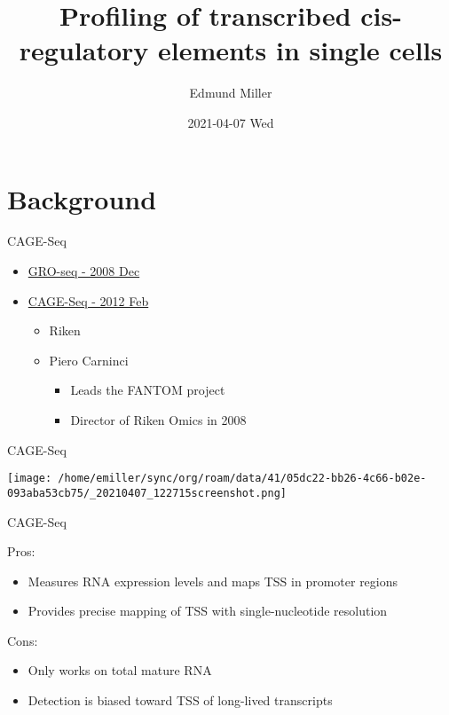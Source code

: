 \documentclass[bigger]{beamer}
\author{Edmund Miller}
\date{2021-04-07 Wed}
\title{Profiling of transcribed cis-regulatory elements in single cells}
\begin{document}
\maketitle

\section{Background}
\label{sec:orgb7d8447}

\begin{frame}[label={sec:orgd54c556}]{CAGE-Seq}
\begin{itemize}
\item \href{https://pubmed.ncbi.nlm.nih.gov/19056941/}{GRO-seq - 2008 Dec}
\item \href{https://pubmed.ncbi.nlm.nih.gov/22362160/}{CAGE-Seq - 2012 Feb}
\begin{itemize}
\item Riken
\item Piero Carninci
\begin{itemize}
\item Leads the FANTOM project
\item Director of Riken Omics in 2008
\end{itemize}
\end{itemize}
\end{itemize}
\end{frame}

\begin{frame}[label={sec:orge00eecc}]{CAGE-Seq}
\begin{center}
\texttt{[image: /home/emiller/sync/org/roam/data/41/05dc22-bb26-4c66-b02e-093aba53cb75/\_20210407\_122715screenshot.png]}
\end{center}
\end{frame}

\begin{frame}[label={sec:orga0f071e}]{CAGE-Seq}
\begin{block}{Pros:}
\begin{itemize}
\item Measures RNA expression levels and maps TSS in promoter regions
\item Provides precise mapping of TSS with single-nucleotide resolution
\end{itemize}
\end{block}

\begin{block}{Cons:}
\begin{itemize}
\item Only works on total mature RNA
\item Detection is biased toward TSS of long-lived transcripts
\end{itemize}
\end{block}
\end{frame}
\end{document}
